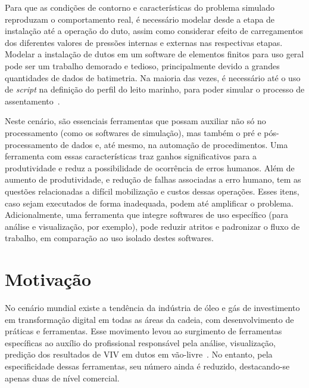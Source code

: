 Para que as condições de contorno e características do problema simulado reproduzam o comportamento real, é necessário modelar desde a etapa de instalação até a operação do duto, assim como considerar efeito de carregamentos dos diferentes valores de pressões internas e externas nas respectivas etapas.
Modelar a instalação de dutos em um software de elementos finitos para uso geral pode ser um trabalho demorado e tedioso, principalmente devido a grandes quantidades de dados de batimetria.
Na maioria das vezes, é necessário até o uso de \textit{script} na definição do perfil do leito marinho, para poder simular o processo de assentamento~\cite{VandenAbeele2013}.

Neste cenário, são essenciais ferramentas que possam auxiliar não só no processamento (como os softwares de simulação), mas também o pré e pós-processamento de dados e, até mesmo, na automação de procedimentos.
Uma ferramenta com essas características traz ganhos significativos para a produtividade e reduz a possibilidade de ocorrência de erros humanos.
Além de aumento de produtividade, e redução de falhas associadas a erro humano, tem as questões relacionadas a difícil mobilização e custos dessas operações. Esses itens, caso sejam executados de forma inadequada, podem até amplificar o problema.
Adicionalmente, uma ferramenta que integre softwares de uso específico (para análise e visualização, por exemplo), pode reduzir atritos e padronizar o fluxo de trabalho, em comparação ao uso isolado destes softwares.


\section{Motivação}



No cenário mundial existe a tendência da indústria de óleo e gás de investimento em transformação digital em todas as áreas da cadeia, com desenvolvimento de práticas e ferramentas. Esse movimento levou ao surgimento de ferramentas específicas ao auxílio do profissional responsável pela análise, visualização, predição dos resultados de VIV em dutos em vão-livre~\cite{Mittal2017}. No entanto, pela especificidade dessas ferramentas, seu número ainda é reduzido, destacando-se apenas duas de nível comercial.


